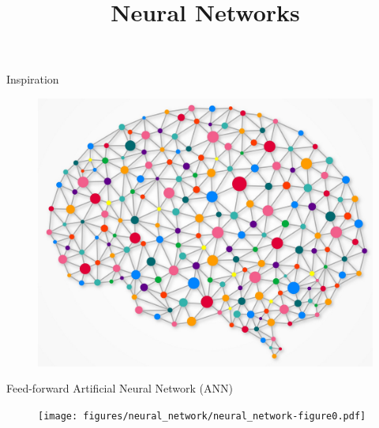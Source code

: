 \documentclass[]{beamer}
\begin{document}
\title{Neural Networks}

\begin{frame}
\titlepage
\end{frame}

\begin{frame}
   {Inspiration}
   \begin{figure}
      \centering
      \includegraphics[width=0.75\linewidth]{figures/brain_network_crop.jpg}
   \end{figure}
\end{frame}

% 
\begin{frame}[fragile]
   {Feed-forward Artificial Neural Network (ANN)}
   \begin{figure}
      \centering
      \texttt{[image: figures/neural\_network/neural\_network-figure0.pdf]}
   \end{figure}
\end{frame}
\end{document}
